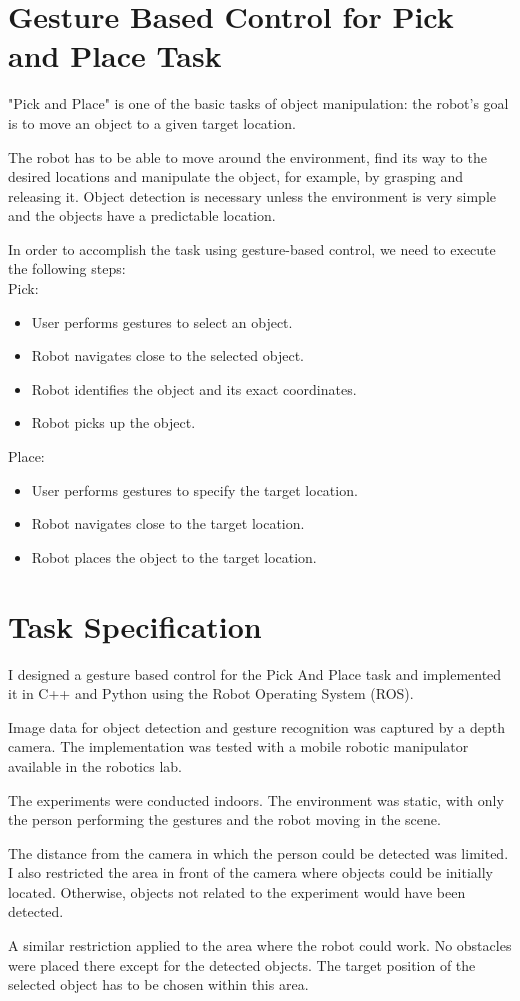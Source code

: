 \section{Gesture Based Control for Pick and Place Task}
"Pick and Place" is one of the basic tasks of object manipulation: the robot's goal is to move an object to a given target location.\par
The robot has to be able to move around the environment, find its way to the desired locations and manipulate the object, for example, by grasping and releasing it. Object detection is necessary unless the environment is very simple and the objects have a predictable location.\par
In order to accomplish the task using gesture-based control, we need to execute the following steps:\\


Pick:\\
\begin{itemize}
\item {User performs gestures to select an object.}
\item {Robot navigates close to the selected object.}
\item {Robot identifies the object and its exact coordinates.}
\item {Robot picks up the object.}
\end{itemize}


Place:\\
\begin{itemize}
\item {User performs gestures to specify the target location.}
\item {Robot navigates close to the target location.}
\item {Robot places the object to the target location.}
\end{itemize}


\section{Task Specification}
I designed a gesture based control for the Pick And Place task and implemented it in C++ and Python using the Robot Operating System (ROS).\par
Image data for object detection and gesture recognition was captured by a depth camera. The implementation was tested with a mobile robotic manipulator available in the robotics lab.\par
The experiments were conducted indoors. The environment was static, with only the person performing the gestures and the robot moving in the scene.\par
The distance from the camera in which the person could be detected was limited. I also restricted the area in front of the camera where objects could be initially located. Otherwise, objects not related to the experiment would have been detected.\par
A similar restriction applied to the area where the robot could work. No obstacles were placed there except for the detected objects. The target position of the selected object has to be chosen within this area.\par


